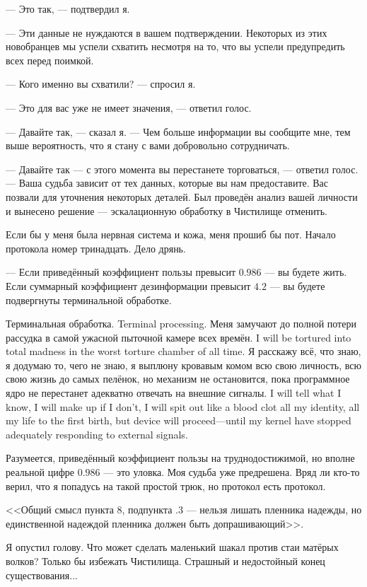 --- Это так, --- подтвердил я.

--- Эти данные не нуждаются в вашем подтверждении.
Некоторых из этих новобранцев мы успели схватить несмотря на то, что вы успели предупредить всех перед поимкой.

--- Кого именно вы схватили? --- спросил я.

--- Это для вас уже не имеет значения, --- ответил голос.

--- Давайте так, --- сказал я.
--- Чем больше информации вы сообщите мне, тем выше вероятность, что я стану с вами добровольно сотрудничать.

--- Давайте так --- с этого момента вы перестанете торговаться, --- ответил голос.
--- Ваша судьба зависит от тех данных, которые вы нам предоставите.
Вас позвали для уточнения некоторых деталей.
Был проведён анализ вашей личности и вынесено решение --- эскалационную обработку в Чистилище отменить.

Если бы у меня была нервная система и кожа, меня прошиб бы пот.
Начало протокола номер тринадцать.
Дело дрянь.

--- Если приведённый коэффициент пользы превысит $0.986$ --- вы будете жить.
Если суммарный коэффициент дезинформации превысит $4.2$ --- вы будете подвергнуты терминальной обработке.

{Терминальная обработка.}
{Terminal processing.}
{Меня замучают до полной потери рассудка в самой ужасной пыточной камере всех времён.}
{I will be tortured into total madness in the worst torture chamber of all time.}
{Я расскажу всё, что знаю, я додумаю то, чего не знаю, я выплюну кровавым комом всю свою личность, всю свою жизнь до самых пелёнок, но механизм не остановится, пока программное ядро не перестанет адекватно отвечать на внешние сигналы.}
{I will tell what I know, I will make up if I don't, I will spit out like a blood clot all my identity, all my life to the first birth, but device will proceed---until my kernel have stopped adequately responding to external signals.}

Разумеется, приведённый коэффициент пользы на труднодостижимой, но вполне реальной цифре $0.986$ --- это уловка.
Моя судьба уже предрешена.
Вряд ли кто-то верил, что я попадусь на такой простой трюк, но протокол есть протокол.

<<Общий смысл пункта 8, подпункта .3 --- нельзя лишать пленника надежды, но единственной надеждой пленника должен быть допрашивающий>>.

Я опустил голову.
Что может сделать маленький шакал против стаи матёрых волков?
Только бы избежать Чистилища.
Страшный и недостойный конец существования...

